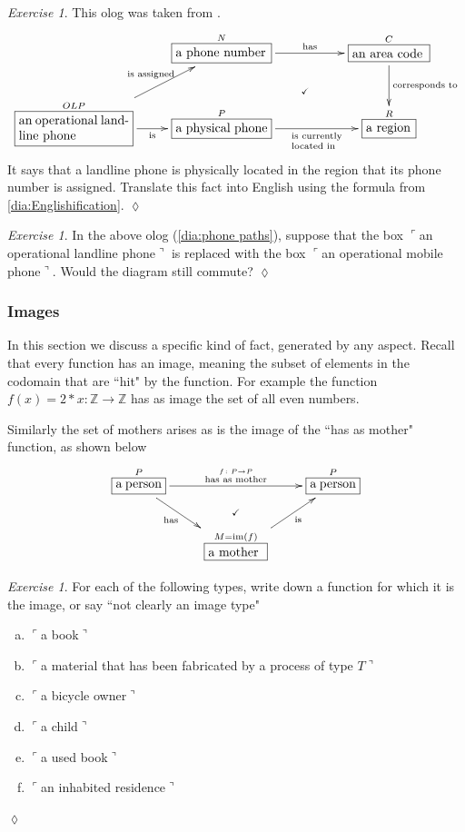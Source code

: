 \documentclass{book}
\def\tn{\textnormal}
\def\ZZ{{\mathbb Z}}
\def\im{\tn{im}}
\def\to{\rightarrow}
\def\taking{\colon}
\newcommand{\LA}[2]{\ar[#1]^-{\tn {#2}}}
\newcommand{\LAL}[2]{\ar[#1]_-{\tn {#2}}}
\newcommand{\obox}[3]{\stackrel{#1}{\fbox{\parbox{#2}{#3}}}}
\newcommand{\fakebox}[1]{\tn{$\ulcorner$#1$\urcorner$}}
\theoremstyle{remark}
\newtheorem{exc}[subsubsection]{Exercise}
\newenvironment{exercise}{\begin{exc}}{\hspace*{\fill}$\lozenge$\end{exc}}
\theoremstyle{definition}
\def\sexc{\begin{enumerate}[a.)]\setlength{\itemsep}{.1cm}\setlength{\parskip}{.1cm}\item}
\def\next{\item}
\def\endsexc{\end{enumerate}}
\begin{document}
\begin{exercise}
This olog was taken from \cite{Sp1}.
\begin{align}\label{dia:phone paths}\xymatrix{&\obox{N}{1in}{a phone number}\LA{rr}{has}&&\obox{C}{.8in}{an area code}\ar@{}[dll]|{\checkmark}\LA{d}{corresponds to}\\\obox{OLP}{1.2in}{an operational landline phone}\LA{ru}{is assigned}\LAL{r}{is}&\obox{P}{1in}{a physical phone}\LAL{rr}{\parbox{.55in}{\scriptsize is currently located in}}&&\obox{R}{.5in}{a region}}
\end{align} 
It says that a landline phone is physically located in the region that its phone number is assigned. Translate this fact into English using the formula from \ref{dia:Englishification}.
\end{exercise}

\begin{exercise}
In the above olog (\ref{dia:phone paths}), suppose that the box \fakebox{an operational landline phone} is replaced with the box \fakebox{an operational mobile phone}. Would the diagram still commute?
\end{exercise}


\subsubsection{Images}\label{sec:images}

In this section we discuss a specific kind of fact, generated by any aspect. Recall that every function has an image, meaning the subset of elements in the codomain that are ``hit" by the function. For example the function $f(x)=2*x\taking \ZZ\to\ZZ$ has as image the set of all even numbers.

Similarly the set of mothers arises as is the image of the ``has as mother" function, as shown below 
$$
\xymatrix{\obox{P}{.5in}{a person}\LAL{rd}{has}\LA{rr}{$\stackrel{f\taking P\to P}{\tn{has as mother}}$}&&\obox{P}{.5in}{a person}\\
&\obox{M=\im(f)}{.6in}{a mother}\LAL{ur}{is}\ar@{}[u]|(.6){\checkmark}
}$$

\begin{exercise}
For each of the following types, write down a function for which it is the image, or say ``not clearly an image type" 
\sexc \fakebox{a book}
\next \fakebox{a material that has been fabricated by a process of type $T$}
\next \fakebox{a bicycle owner}
\next \fakebox{a child}
\next \fakebox{a used book}
\next \fakebox{an inhabited residence}
\endsexc
\end{exercise}
\end{document}
